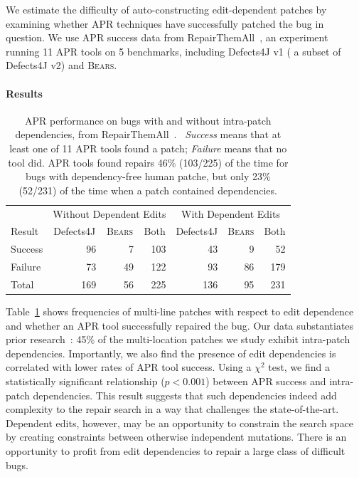 \documentclass[10pt, conference]{IEEEtran}
\newcommand\bears{\textsc{Bears}\xspace}
\begin{document}
We estimate the difficulty of auto-constructing edit-dependent patches 
by examining whether APR techniques have successfully patched the
bug in question. We use APR success data from 
RepairThemAll~\cite{durieux-repair-them-all}, an experiment 
running 11 APR tools on 5 benchmarks, including Defects4J v1
( a subset of Defects4J v2) and \bears.

\paragraph{Results}

\begin{table}
{\begin{center}
    \begin{tabular}{lrrrrrr}
        \toprule
        &\multicolumn{3}{c}{Without Dependent Edits} & \multicolumn{3}{c}{With Dependent Edits} \\
        Result& \multicolumn{1}{c}{Defects4J} & \multicolumn{1}{c}{\bears} & \multicolumn{1}{c}{Both} & \multicolumn{1}{c}{Defects4J} & \multicolumn{1}{c}{\bears} & \multicolumn{1}{c}{Both} \\
        \midrule
        Success & 96 & 7 & 103 & 43 & 9 &  52 \\
        Failure & 73 & 49 & 122 & 93 & 86 & 179\\
        \midrule
        Total  & 169 & 56 & 225 & 136 & 95 & 231\\
        \bottomrule
    \end{tabular}
 \end{center}
}	\caption{\small APR performance on bugs with and without intra-patch 
      dependencies, from RepairThemAll~\cite{durieux-repair-them-all}.\protect\footnotemark
      \ \emph{Success} means that at least one of 11 APR tools found a patch; 
      \emph{Failure} means that no tool did.  APR tools found repairs 46\%
      (103/225) of the time for bugs with dependency-free human patche, but only
      23\% (52/231) of the time when a patch contained dependencies.}
	\label{tab:dependency-repair-contingency-table}
\end{table}
Table~\ref{tab:dependency-repair-contingency-table}
shows frequencies of multi-line patches with respect to edit dependence 
and whether an APR tool successfully repaired the bug.
Our data substantiates prior research~\cite{zhong2015}:
45\% of the multi-location patches we study exhibit intra-patch dependencies. 
Importantly, 
we also find the presence of edit dependencies is correlated with lower rates of
APR tool success. 
Using a $\chi^2$ test, we find a statistically significant relationship ($p < 0.001$)
between APR success and intra-patch dependencies.
This result 
suggests that such dependencies indeed 
add complexity to the repair search in a way that challenges the state-of-the-art.
Dependent edits, however, may 
be an opportunity to constrain the search space by creating constraints between 
otherwise independent mutations.  There is an opportunity to profit from edit 
dependencies to repair a large class of difficult bugs.
\end{document}
